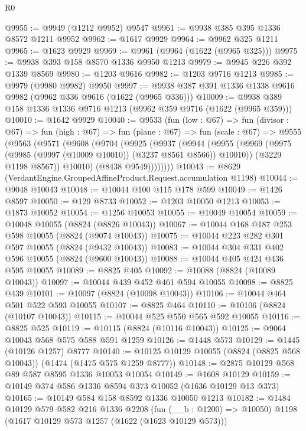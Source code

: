 \begin{lexlean}{R0}
\begin{coremodule}
@9955 := @9949 (@1212 @9952) @9547
@9961 := @9938 @385 @395 @1336 @8572 @1211 @9952
@9962 := @1617 @9929
@9964 := @9962 @325 @1211
@9965 := @1623 @9929
@9969 := @9961 (@9964 (@1622 (@9965 @325)))
@9975 := @9938 @393 @158 @8570 @1336 @9950 @1213
@9979 := @9945 @226 @392 @1339 @8569
@9980 := @1203 @9616
@9982 := @1203 @9716 @1213
@9985 := @9979 (@9980 @9982) @9950
@9997 := @9938 @387 @391 @1336 @1338 @9616 @9982 (@9962 @336 @9616 (@1622 (@9965 @336)))
@10009 := @9938 @389 @158 @1336 @1336 @9716 @1213 (@9962 @359 @9716 (@1622 (@9965 @359)))
@10010 := @1642 @9929
@10040 := @9533
    (fun (low : @67) =>
    fun (divisor : @67) =>
    fun (high : @67) =>
    fun (plane : @67) =>
    fun (scale : @67) =>
    @9555
      (@9563
        (@9571
          (@9608
            (@9704
              (@9925
                (@9937
                  (@9944
                    (@9955
                      (@9969 (@9975 (@9985 (@9997 (@10009 @10010)) (@3237 @8561 @8566)) @10010))
                      (@3229 @1198 @8567))
                    @10010)
                  (@8438 @9549))))))))
@10043 := @8629 (VerdantEngine.GroupedAffineProduct.Request.accumulation @1198)
@10044 := @9048 @10043
@10048 := @10044 @100 @115 @178 @599
@10049 := @1426 @8597
@10050 := @129 @8733
@10052 := @1203 @10050 @1213
@10053 := @1873 @10052
@10054 := @1256 @10053
@10055 := @10049 @10054
@10059 := @10048 @10055 (@8824 (@8826 @10043))
@10067 := @10044 @168 @187 @253 @598 @10055 (@8824 (@9074 @10043))
@10075 := @10044 @223 @282 @301 @597 @10055 (@8824 (@9432 @10043))
@10083 := @10044 @304 @331 @402 @596 @10055 (@8824 (@9600 @10043))
@10088 := @10044 @405 @424 @436 @595 @10055
@10089 := @8825 @405
@10092 := @10088 (@8824 (@10089 @10043))
@10097 := @10044 @439 @452 @461 @594 @10055
@10098 := @8825 @439
@10101 := @10097 (@8824 (@10098 @10043))
@10106 := @10044 @464 @501 @522 @593 @10055
@10107 := @8825 @464
@10110 := @10106 (@8824 (@10107 @10043))
@10115 := @10044 @525 @550 @565 @592 @10055
@10116 := @8825 @525
@10119 := @10115 (@8824 (@10116 @10043))
@10125 := @9064 @10043 @568 @575 @588 @591 @1259
@10126 := @1448 @573
@10129 := @1445 (@10126 @1257) @8777
@10140 := @10125 @10129 @10055 (@8824 (@8825 @568 @10043)) (@1474 (@1475 @575 @1259 @8777))
@10148 := @2875 @10129 @568 @89 @587 @8595 @1336 @10053 @10054
@10149 := @1608 @10129
@10159 := @10149 @374 @586 @1336 @8594 @373 @10052 (@1636 @10129 @13 @373)
@10165 := @10149 @584 @158 @8592 @1336 @10050 @1213
@10182 := @1484
    @10129
    @579
    @582
    @216
    @1336
    @2208
    (fun (__b : @1200) => @10050)
    @1198
    (@1617 @10129 @573 @1257 (@1622 (@1623 @10129 @573)))

\end{coremodule}
\end{lexlean}
